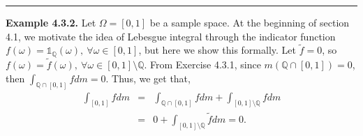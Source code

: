 \documentclass{article}
\begin{document}
\begin{center}
	\noindent\rule{12cm}{0.4pt}
\end{center}
\textbf{Example 4.3.2.} Let $\Omega = [0,1]$ be a sample space. At the beginning of section 4.1, we motivate the idea of Lebesgue integral through the indicator function $f(\omega) = \mathds{1}_{\mathbb{Q}}(\omega), \ \forall \omega \in [0,1]$, but here we show this formally. Let $\tilde{f} = 0$, so $f(\omega) = \tilde{f}(\omega), \ \forall \omega \in [0,1] \setminus \mathbb{Q}$. From Exercise 4.3.1, since $m(\mathbb{Q} \cap [0,1]) = 0$, then $\int_{\mathbb{Q} \cap [0,1]} f dm = 0$. Thus, we get that,
\begin{eqnarray}
\nonumber
\int_{[0,1]} f dm &=& \int_{\mathbb{Q}\cap[0,1]}f dm + \int_{[0,1]\setminus\mathbb{Q}}f dm\\
\nonumber
&=&  0 + \int_{[0,1]\setminus\mathbb{Q}}\tilde{f} dm = 0.
\end{eqnarray}
\end{document}
